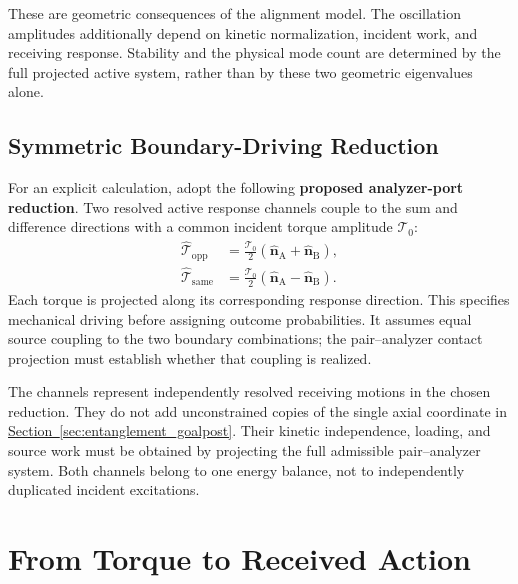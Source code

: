 These are geometric consequences of the alignment model. The oscillation amplitudes additionally depend on kinetic normalization, incident work, and receiving response. Stability and the physical mode count are determined by the full projected active system, rather than by these two geometric eigenvalues alone.

\subsection{Symmetric Boundary-Driving Reduction}

For an explicit calculation, adopt the following \textbf{proposed analyzer-port reduction}. Two resolved active response channels couple to the sum and difference directions with a common incident torque amplitude $\mathcal T_0$:
\begin{equation}
    \boxed{
    \begin{aligned}
    \widehat{\boldsymbol{\mathcal T}}_{\mathrm{opp}}
    &=\frac{\mathcal T_0}{2}
      (\widehat{\mathbf n}_{\mathrm A}+\widehat{\mathbf n}_{\mathrm B}),\\
    \widehat{\boldsymbol{\mathcal T}}_{\mathrm{same}}
    &=\frac{\mathcal T_0}{2}
      (\widehat{\mathbf n}_{\mathrm A}-\widehat{\mathbf n}_{\mathrm B}).
    \end{aligned}
    }
\end{equation}
Each torque is projected along its corresponding response direction. This specifies mechanical driving before assigning outcome probabilities. It assumes equal source coupling to the two boundary combinations; the pair--analyzer contact projection must establish whether that coupling is realized.

The channels represent independently resolved receiving motions in the chosen reduction. They do not add unconstrained copies of the single axial coordinate in \hyperref[sec:entanglement_goalpost]{Section~\ref*{sec:entanglement_goalpost}}. Their kinetic independence, loading, and source work must be obtained by projecting the full admissible pair--analyzer system. Both channels belong to one energy balance, not to independently duplicated incident excitations.

\section{From Torque to Received Action}
\label{sec:entanglement_action_partition}

